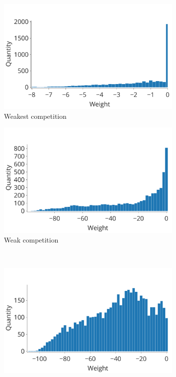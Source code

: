 \documentclass[a4paper]{article}
\begin{document}
\begin{figure}
\centering
\begin{subfigure}{0.45\textwidth}
    \includegraphics[width=\textwidth,keepaspectratio=true]{competition_distribution_worst.pdf}
    \caption{Weakest competition}
\end{subfigure}
\begin{subfigure}{0.45\textwidth}
    \includegraphics[width=\textwidth,keepaspectratio=true]{competition_distribution_medium_bad.pdf}
    \caption{Weak competition}
\end{subfigure}
\\
\begin{subfigure}{0.45\textwidth}
    \includegraphics[width=\textwidth,keepaspectratio=true]{competition_distribution_medium_good.pdf}

\end{subfigure}
\end{figure}
\end{document}
